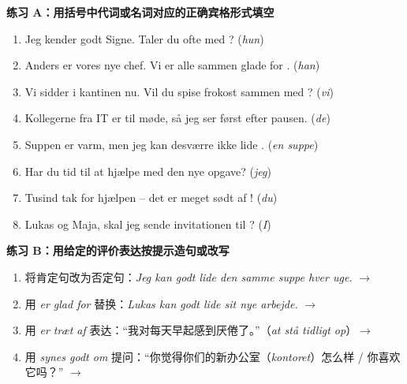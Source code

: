 \textbf{练习 A：用括号中代词或名词对应的正确宾格形式填空}
\begin{enumerate}
  \item Jeg kender godt Signe. Taler du ofte med \underline{\hspace{2.0cm}}? (\textit{hun})
  \item Anders er vores nye chef. Vi er alle sammen glade for \underline{\hspace{2.0cm}}. (\textit{han})
  \item Vi sidder i kantinen nu. Vil du spise frokost sammen med \underline{\hspace{2.0cm}}? (\textit{vi})
  \item Kollegerne fra IT er til møde, så jeg ser \underline{\hspace{2.0cm}} først efter pausen. (\textit{de})
  \item Suppen er varm, men jeg kan desværre ikke lide \underline{\hspace{2.0cm}}. (\textit{en suppe})
  \item Har du tid til at hjælpe \underline{\hspace{2.0cm}} med den nye opgave? (\textit{jeg})
  \item Tusind tak for hjælpen – det er meget sødt af \underline{\hspace{2.0cm}}! (\textit{du})
  \item Lukas og Maja, skal jeg sende invitationen til \underline{\hspace{2.0cm}}? (\textit{I})
\end{enumerate}

\textbf{练习 B：用给定的评价表达按提示造句或改写}
\begin{enumerate}
  \item 将肯定句改为否定句：\textit{Jeg kan godt lide den samme suppe hver uge.} $\rightarrow$\newline \underline{\hspace{8.0cm}}
  \item 用 \textit{er glad for} 替换：\textit{Lukas kan godt lide sit nye arbejde.} $\rightarrow$\newline \underline{\hspace{8.0cm}}
  \item 用 \textit{er træt af} 表达：“我对每天早起感到厌倦了。”（\textit{at stå tidligt op}）$\rightarrow$\newline \underline{\hspace{8.0cm}}
  \item 用 \textit{synes godt om} 提问：“你觉得你们的新办公室（\textit{kontoret}）怎么样 / 你喜欢它吗？” $\rightarrow$\newline \underline{\hspace{8.0cm}}
\end{enumerate}

